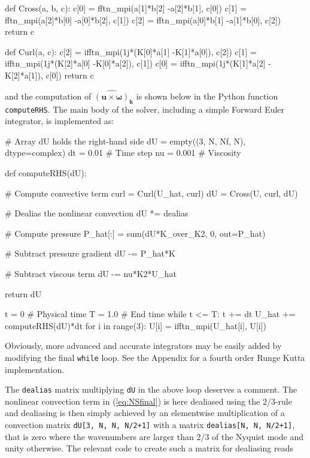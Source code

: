 \documentclass[final,3p,times,twocolumn]{elsarticle}
\newcommand{\inpyth}{\lstinline[style=inlinestyle]}
\begin{document}
\begin{python}
def Cross(a, b, c):
    c[0] = fftn_mpi(a[1]*b[2]
                   -a[2]*b[1], c[0])
    c[1] = fftn_mpi(a[2]*b[0]
                   -a[0]*b[2], c[1])
    c[2] = fftn_mpi(a[0]*b[1]
                   -a[1]*b[0], c[2])
    return c

def Curl(a, c):
    c[2] = ifftn_mpi(1j*(K[0]*a[1]
                        -K[1]*a[0]), c[2])
    c[1] = ifftn_mpi(1j*(K[2]*a[0]
                        -K[0]*a[2]), c[1])
    c[0] = ifftn_mpi(1j*(K[1]*a[2]
                        -K[2]*a[1]), c[0])
    return c

\end{python}
and the computation of $\widehat{( \bm{u} \times \bm{\omega})}_{\bm{k}}$ is 
shown below in the Python function \inpyth{computeRHS}. The main body of the 
solver, including a simple Forward Euler integrator, is implemented as:

\begin{python}
# Array dU holds the right-hand side
dU = empty((3, N, Nf, N), dtype=complex)  
dt = 0.01    # Time step
nu = 0.001   # Viscosity

def computeRHS(dU):

    # Compute convective term
    curl = Curl(U_hat, curl)
    dU = Cross(U, curl, dU)

    # Dealias the nonlinear convection
    dU *= dealias

    # Compute pressure
    P_hat[:] = sum(dU*K_over_K2, 0, 
                   out=P_hat)

    # Subtract pressure gradient
    dU -= P_hat*K

    # Subtract viscous term
    dU -= nu*K2*U_hat

    return dU

t = 0        # Physical time
T = 1.0      # End time
while t <= T:
    t += dt
    U_hat += computeRHS(dU)*dt
    for i in range(3):
        U[i] = ifftn_mpi(U_hat[i], U[i])

\end{python}
Obviously, more advanced and accurate integrators may be easily added by modifying the final \inpyth{while} loop. See the Appendix for a fourth order Runge Kutta implementation.

The \inpyth{dealias} matrix multiplying \inpyth{dU} in the above
loop deserves a comment.
The nonlinear convection term in (\ref{eq:NSfinal}) is here dealiased using the 2/3-rule \cite{orzag71} and dealiasing is then simply achieved by an elementwise multiplication of a convection matrix \inpyth{dU[3, N, N, N/2+1]} with a matrix \inpyth{dealias[N, N, N/2+1]}, that is zero where the wavenumbers are larger than 2/3 of the Nyquist mode and unity otherwise. The relevant code to create such a matrix for dealiasing reads
\end{document}
